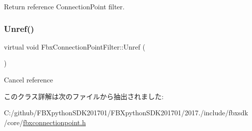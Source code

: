 Return reference Connection\+Point filter. 

\mbox{\label{class_fbx_connection_point_filter_ab56025ba81b8ffa45d6a312fad9dcf20}} 
\subsubsection{\texorpdfstring{Unref()}{Unref()}}
{\footnotesize\ttfamily virtual void Fbx\+Connection\+Point\+Filter\+::\+Unref (\begin{DoxyParamCaption}{ }\end{DoxyParamCaption})\hspace{0.3cm}{\ttfamily [virtual]}}



Cancel reference 



このクラス詳解は次のファイルから抽出されました\+:\begin{DoxyCompactItemize}
\item 
C\+:/github/\+F\+B\+Xpython\+S\+D\+K201701/\+F\+B\+Xpython\+S\+D\+K201701/2017./include/fbxsdk/core/\hyperlink{fbxconnectionpoint_8h}{fbxconnectionpoint.\+h}\end{DoxyCompactItemize}
